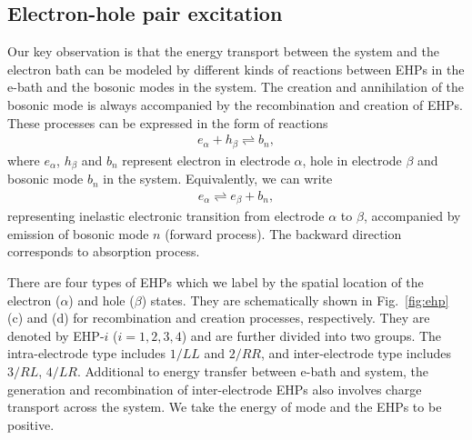 \documentclass[aps,prb,
,floatfix,footinbib,shortbibliography,
preprint
]{revtex4-1}
\begin{document}
\subsection{Electron-hole pair excitation}
Our key observation is that the energy transport between the system and the electron bath can be modeled by different kinds of reactions between EHPs in the e-bath and the bosonic modes in the system. The creation and annihilation of the bosonic mode is always accompanied by the recombination and creation of EHPs. These processes can be expressed in the form of reactions
\begin{align}
e_\alpha + h_\beta \rightleftharpoons b_n,
\label{eq:reaction}
\end{align}
where $e_\alpha$, $h_\beta$ and $b_n$ represent electron in electrode $\alpha$, hole in electrode $\beta$ and bosonic mode $b_n$ in the system. Equivalently, we can write 
\begin{align}
e_\alpha \rightleftharpoons e_\beta + b_n,
\label{eq:reaction2}
\end{align}
representing inelastic electronic transition from electrode $\alpha$ to $\beta$, accompanied by emission of bosonic mode $n$ (forward process). The backward direction corresponds to absorption process.


There are four types of EHPs which we label by the spatial location of the electron ($\alpha$) and hole  ($\beta$) states. They are schematically shown in Fig.~\ref{fig:ehp} (c) and (d) for recombination and creation processes, respectively. They are denoted by EHP-$i$ ($i=1,2,3,4$) and are further divided into two groups. The intra-electrode type includes $1/LL$ and $2/RR$, and inter-electrode type includes $3/RL$, $4/LR$.  Additional to energy transfer between e-bath and system, the generation and recombination of inter-electrode EHPs also involves charge transport across the system. We take the energy of mode  and the EHPs to be positive. 
\end{document}
